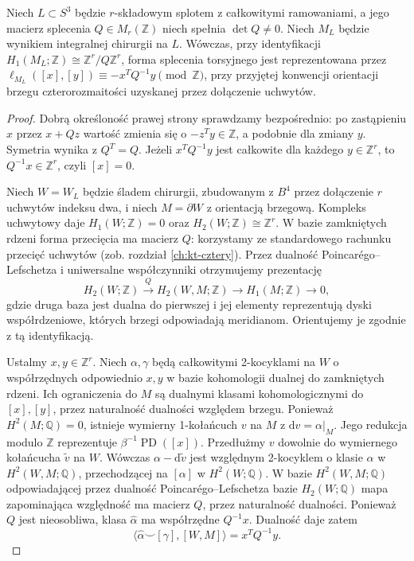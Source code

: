 \begin{twierdzenie}
Niech $L\subset S^3$ będzie $r$-składowym splotem z
całkowitymi ramowaniami, a jego macierz splecenia
$Q\in M_r(\mathbb Z)$ niech spełnia $\det Q\ne0$.
Niech $M_L$ będzie wynikiem integralnej chirurgii na $L$.
Wówczas, przy identyfikacji
$H_1(M_L;\mathbb Z)\cong\mathbb Z^r/Q\mathbb Z^r$,
forma splecenia torsyjnego jest reprezentowana przez
$\ell_{M_L}([x],[y])\equiv -x^TQ^{-1}y\pmod{\mathbb Z}$,
przy przyjętej konwencji orientacji brzegu czterorozmaitości
uzyskanej przez dołączenie uchwytów.
\end{twierdzenie}

\begin{proof}
Dobrą określoność prawej strony sprawdzamy bezpośrednio:
po zastąpieniu $x$ przez $x+Qz$ wartość zmienia się
o $-z^Ty\in\mathbb Z$, a podobnie dla zmiany $y$.
Symetria wynika z $Q^T=Q$. Jeżeli $x^TQ^{-1}y$
jest całkowite dla każdego $y\in\mathbb Z^r$,
to $Q^{-1}x\in\mathbb Z^r$, czyli $[x]=0$.

Niech $W=W_L$ będzie śladem chirurgii, zbudowanym
z $B^4$ przez dołączenie $r$ uchwytów indeksu dwa,
i niech $M=\partial W$ z orientacją brzegową.
Kompleks uchwytowy daje $H_1(W;\mathbb Z)=0$ oraz
$H_2(W;\mathbb Z)\cong\mathbb Z^r$. W bazie
zamkniętych rdzeni forma przecięcia ma macierz $Q$:
korzystamy ze standardowego rachunku przecięć uchwytów
(zob. rozdział \ref{ch:kt-cztery}).
Przez dualność Poincarégo--Lefschetza i uniwersalne
współczynniki otrzymujemy prezentację
\[
H_2(W;\mathbb Z)\xrightarrow{Q}H_2(W,M;\mathbb Z)
\longrightarrow H_1(M;\mathbb Z)\longrightarrow0,
\]
gdzie druga baza jest dualna do pierwszej i jej
elementy reprezentują dyski współrdzeniowe, których
brzegi odpowiadają meridianom. Orientujemy je
zgodnie z tą identyfikacją.

Ustalmy $x,y\in\mathbb Z^r$. Niech $\alpha,\gamma$
będą całkowitymi 2-kocyklami na $W$ o współrzędnych
odpowiednio $x,y$ w bazie kohomologii dualnej do
zamkniętych rdzeni. Ich ograniczenia do $M$ są
dualnymi klasami kohomologicznymi do $[x],[y]$,
przez naturalność dualności względem brzegu.
Ponieważ $H^2(M;\mathbb Q)=0$, istnieje wymierny
1-kołańcuch $v$ na $M$ z $\mathrm dv=\alpha|_M$.
Jego redukcja modulo $\mathbb Z$ reprezentuje
$\beta^{-1}\operatorname{PD}([x])$. Przedłużmy $v$
dowolnie do wymiernego kołańcucha $\widetilde v$ na $W$.
Wówczas $\alpha-\mathrm d\widetilde v$ jest względnym
2-kocyklem o klasie $\widehat\alpha$ w $H^2(W,M;\mathbb Q)$,
przechodzącej na $[\alpha]$ w $H^2(W;\mathbb Q)$.
W bazie $H^2(W,M;\mathbb Q)$ odpowiadającej
przez dualność Poincarégo--Lefschetza bazie
$H_2(W;\mathbb Q)$ mapa zapominająca względność
ma macierz $Q$, przez naturalność dualności.
Ponieważ $Q$ jest nieosobliwa, klasa
$\widehat\alpha$ ma współrzędne $Q^{-1}x$. Dualność daje zatem
\[
\langle\widehat\alpha\smile[\gamma],[W,M]\rangle
=x^TQ^{-1}y.
\]


\end{proof}
